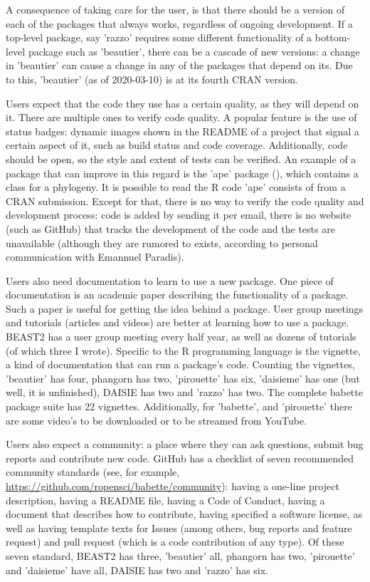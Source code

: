 A consequence of taking care for the user, is that there should be
a version of each of the packages that always works, regardless of ongoing
development. If a top-level package, say 'razzo' requires some different 
functionality of a bottom-level package such as 'beautier', there
can be a cascade of new versions: a change in 'beautier' 
can cause a change in any of the packages that depend on its.
Due to this, 'beautier' (as of 2020-03-10) is at its fourth CRAN version.

Users expect that the code they use has a certain quality,
as they will depend on it. There are multiple ones to verify
code quality. A popular feature is the use of status badges: 
dynamic images shown in the README of a project that 
signal a certain aspect of it, such as build status and code coverage.
Additionally, code should be open, so the style and extent of tests can
be verified. An example of a package that can improve in this
regard is the 'ape' package (\cite{ape}), which contains
a class for a phylogeny. It is possible to read the R code 'ape' consists
of from a CRAN submission. Except for that, there is no way to 
verify the code quality and development process: code is added by sending 
it per email, there is no website (such as
GitHub) that tracks the development of the code and the tests are 
unavailable (although they are rumored to exists, according to personal 
communication with Emannuel Paradis). 

Users also need documentation to learn to use a new package.
One piece of documentation is an academic paper describing the functionality
of a package. Such a paper is useful for getting the idea behind a package.
User group meetings and tutorials (articles and videos) are better at
learning how to use a package. BEAST2 has a user group meeting every half year,
as well as dozens of tutorials (of which three I wrote). Specific to
the R programming language is the vignette, a kind of documentation that
can run a package's code. Counting the vignettes, 'beautier' has four, 
phangorn has two, 'pirouette' has six, 'daisieme' has one (but well,
it is unfinished), DAISIE has two and 'razzo' has two. 
The complete babette package suite has
22 vignettes.
Additionally, for 'babette', and 'pirouette' there are some video's to
be downloaded or to be streamed from YouTube.

Users also expect a community: a place where they can ask questions,
submit bug reports and contribute new code. GitHub has a checklist of
seven recommended community standards (see, for 
example, \url{https://github.com/ropensci/babette/community}): having 
a one-line project description, 
having a README file, having a Code of Conduct, having a
document that describes how to contribute, having specified a software license, 
as well as having template texts for Issues (among others, bug reports
and feature request) and pull request (which is a code contribution of any type).
Of these seven standard, BEAST2 has three, 
'beautier' all, phangorn has two, 'pirouette' and 'daisieme' have all,
DAISIE has two and 'razzo' has six.

